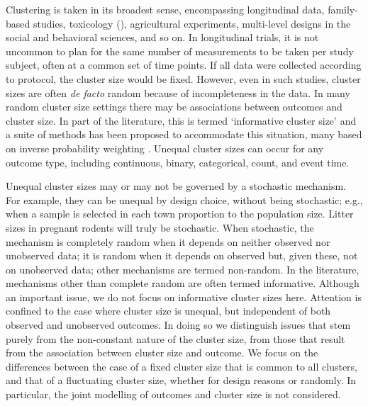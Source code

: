 \documentclass[11pt,a5paper,twoside]{book}
\begin{document}
Clustering is taken in its broadest sense, encompassing longitudinal data, family-based studies, toxicology (\cite{aerts2002}), agricultural experiments, multi-level designs in the social and behavioral sciences, and so on. In longitudinal trials, it is not uncommon to plan for the same number of measurements to be taken per study subject, often at a common set of time points. If all data were collected according to protocol, the cluster size would be fixed. However, even in such studies, cluster sizes are often {\em de facto\/} random because of incompleteness in the data. In many random cluster size settings there may be associations between outcomes and cluster size. In part of the literature, this is termed `informative cluster size' and a suite of methods has been proposed to accommodate this situation, many based on inverse probability weighting \citep{williamson2003marginal, benhin2005mean, hoffman2001, cong2007marginal, chiang2008efficient, wang2011inference, aerts2011incomplete}. Unequal cluster sizes can occur for any outcome type, including continuous, binary, categorical, count, and event time.





Unequal cluster sizes may or may not be governed by a stochastic mechanism. For example, they can be unequal by design choice, without being stochastic; e.g., when a sample is selected in each town proportion to the population size. Litter sizes in pregnant rodents will truly be stochastic. When stochastic, the mechanism is completely random when it depends on neither observed nor unobserved data; it is random when it depends on observed but, given these, not on unobserved data; other mechanisms are termed non-random. In the literature, mechanisms other than complete random are often termed informative. Although an important issue, we do not focus on informative cluster sizes here. Attention is confined to the case where cluster size is unequal, but independent of both observed and unobserved outcomes. In doing so we distinguish issues that stem purely from the non-constant nature of the cluster size, from those that result from the association between cluster size and outcome. We focus on the differences between the case of a fixed cluster size that is common to all clusters, and that of a fluctuating cluster size, whether for design reasons or randomly. In particular, the joint modelling of outcomes and cluster size is not considered.
\end{document}
